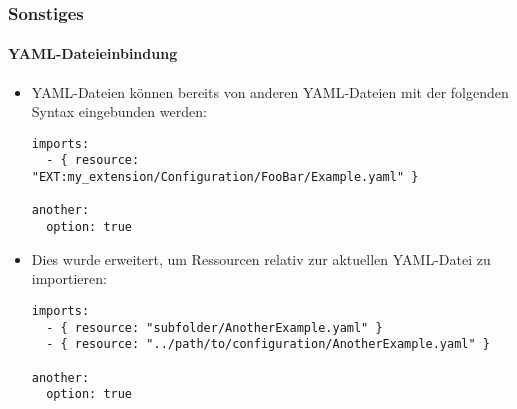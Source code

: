 
\begin{frame}[fragile]
	\frametitle{Sonstiges}
	\framesubtitle{YAML-Dateieinbindung}

	\lstset{basicstyle=\tiny\ttfamily}

	\begin{itemize}
		\item YAML-Dateien können bereits von anderen YAML-Dateien mit der folgenden Syntax eingebunden werden:

\begin{lstlisting}
imports:
  - { resource: "EXT:my_extension/Configuration/FooBar/Example.yaml" }

another:
  option: true
\end{lstlisting}

		\item Dies wurde erweitert, um Ressourcen relativ zur aktuellen YAML-Datei zu importieren:

\begin{lstlisting}
imports:
  - { resource: "subfolder/AnotherExample.yaml" }
  - { resource: "../path/to/configuration/AnotherExample.yaml" }

another:
  option: true
\end{lstlisting}

	\end{itemize}

\end{frame}

